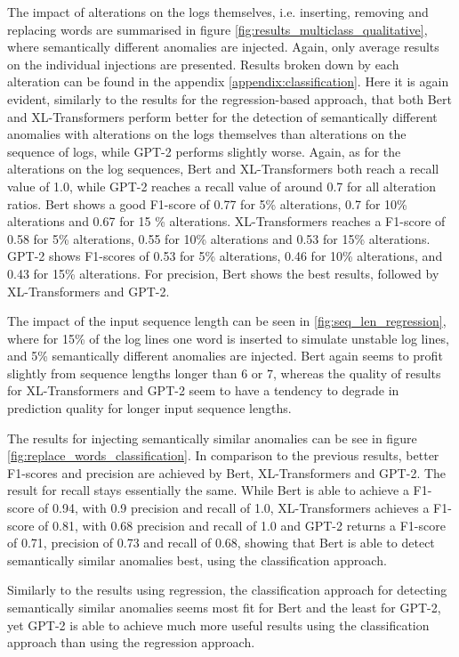 The impact of alterations on the logs themselves, i.e. inserting, removing and replacing words are summarised in figure \ref{fig:results_multiclass_qualitative}, where semantically different anomalies are injected. Again, only average results on the individual injections are presented. Results broken down by each alteration can be found in the appendix \ref{appendix:classification}.
Here it is again evident, similarly to the results for the regression-based approach, that both Bert and XL-Transformers perform better for the detection of semantically different anomalies with alterations on the logs themselves than alterations on the sequence of logs, while GPT-2 performs slightly worse. Again, as for the alterations on the log sequences, Bert and XL-Transformers both reach a recall value of 1.0, while GPT-2 reaches a recall value of around 0.7 for all alteration ratios. Bert shows a good F1-score of 0.77 for 5\% alterations, 0.7 for 10\% alterations and 0.67 for 15 \% alterations. XL-Transformers reaches a F1-score of 0.58 for 5\% alterations, 0.55 for 10\% alterations and 0.53 for 15\% alterations. GPT-2 shows F1-scores of 0.53 for 5\% alterations, 0.46 for 10\% alterations, and 0.43 for 15\% alterations. For precision, Bert shows the best results, followed by XL-Transformers and GPT-2.

The impact of the input sequence length can be seen in \ref{fig:seq_len_regression}, where for 15\% of the log lines one word is inserted to simulate unstable log lines, and 5\% semantically different anomalies are injected. Bert again seems to profit slightly from sequence lengths longer than 6 or 7, whereas the quality of results for XL-Transformers and GPT-2 seem to have a tendency to degrade in prediction quality for longer input sequence lengths.

The results for injecting semantically similar anomalies can be see in figure \ref{fig:replace_words_classification}. In comparison to the previous results, better F1-scores and precision are achieved by Bert, XL-Transformers and GPT-2. The result for recall stays essentially the same. While Bert is able to achieve a F1-score of 0.94, with 0.9 precision and recall of 1.0, XL-Transformers achieves a F1-score of 0.81, with 0.68 precision and recall of 1.0 and GPT-2 returns a F1-score of 0.71, precision of 0.73 and recall of 0.68, showing that Bert is able to detect semantically similar anomalies best, using the classification approach.

Similarly to the results using regression, the classification approach for detecting semantically similar anomalies seems most fit for Bert and the least for GPT-2, yet GPT-2 is able to achieve much more useful results using the classification approach than using the regression approach.



